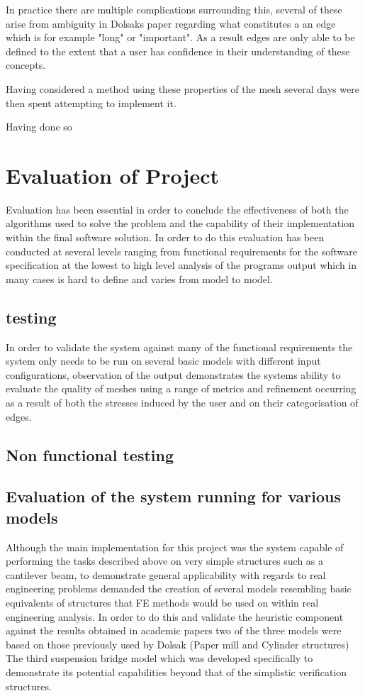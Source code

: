 \documentclass{article}
\begin{document}
\noindent
In practice there are multiple complications surrounding this, several of these arise from ambiguity in Dolsaks paper regarding what constitutes a an edge which is for example "long" or "important". As a result edges are only able to be defined to the extent that a user has confidence in their understanding of these concepts.


Having considered a method using these properties of the mesh several days were then spent attempting to implement it.

Having done so 



\section{Evaluation of Project}
Evaluation has been essential in order to conclude the effectiveness of both the algorithms used to solve the problem and the capability of their implementation within the final software solution. In order to do this evaluation has been conducted at several levels ranging from functional requirements for the software specification at the lowest to high level analysis of the programs output which in many cases is hard to define and varies from model to model.

\subsection{testing}
In order to validate the system against many of the functional requirements the system only needs to be run on several basic models with different input configurations, observation of the output demonstrates the systems ability to evaluate the quality of meshes using a range of metrics and refinement occurring as a result of both the stresses induced by the user and on their categorisation of edges. 

\subsection{Non functional testing}



\subsection{Evaluation of the system running for various models}
Although the main implementation for this project was the system capable of performing the tasks described above on very simple structures such as a cantilever beam, to demonstrate general applicability with regards to real engineering problems demanded the creation of several models resembling basic equivalents of structures that FE methods would be used on within real engineering analysis. In order to do this and validate the heuristic component against the results obtained in academic papers two of the three models were based on those previously used by Dolsak (Paper mill and Cylinder structures) The third suspension bridge model which was developed specifically to demonstrate its potential capabilities beyond that of the simplistic verification structures.
\end{document}
